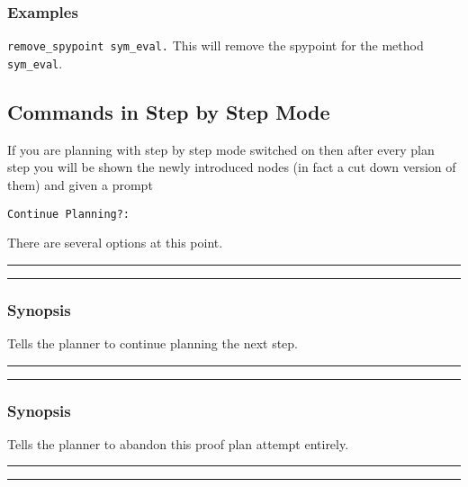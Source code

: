 \subsubsection*{Examples}
{\tt remove\_spypoint sym\_eval.} 
\noindent This will remove the spypoint for the method {\tt sym\_eval}.  

\subsection{Commands in Step by Step  Mode}

If you are planning with step by step mode switched on then after
every plan step you will be shown the newly introduced nodes
(in fact a cut down version of them) and given a prompt

{\tt Continue Planning?:}

\noindent There are several options at this point.

\vspace{2mm}
\hrule
\vspace{2mm}
\begin{Large}
\end{Large}
\vspace{2mm}
\hrule
\vspace{2mm}

\subsubsection*{Synopsis}
Tells the planner to continue planning the next step.

\vspace{2mm}
\hrule
\begin{Large}
\end{Large}
\vspace{2mm}
\hrule
\vspace{2mm}


\subsubsection*{Synopsis}
Tells the planner to abandon this proof plan attempt entirely.

\vspace{2mm}
\hrule
\vspace{2mm}
\begin{Large}
\end{Large}
\vspace{2mm}
\hrule
\vspace{2mm}

